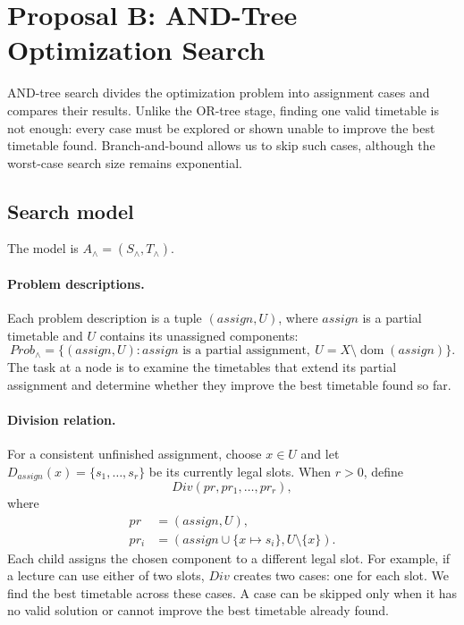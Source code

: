 \section{Proposal B: AND-Tree Optimization Search}
\label{andopt:section}

AND-tree search divides the optimization problem into
assignment cases and compares their results. Unlike the
OR-tree stage, finding one valid timetable is not enough:
every case must be explored or shown unable to improve
the best timetable found. Branch-and-bound allows us
to skip such cases, although the worst-case search
size remains exponential.

\subsection{Search model}
\label{sec:and-model}

The model is $A_{\land}=(S_{\land},T_{\land})$.

\paragraph{Problem descriptions.}
Each problem description is a tuple
$(\mathit{assign},U)$, where $\mathit{assign}$ is a
partial timetable and $U$ contains its unassigned
components:
\[
\mathit{Prob}_{\land}
=\{(\mathit{assign},U):
  \mathit{assign}\text{ is a partial assignment},\
  U=X\setminus\operatorname{dom}(\mathit{assign})\}.
\]
The task at a node is to examine the timetables that extend
its partial assignment and determine whether they improve
the best timetable found so far.

\paragraph{Division relation.}
For a consistent unfinished assignment, choose
$x\in U$ and let
$D_{\mathit{assign}}(x)=\{s_1,\ldots,s_r\}$
be its currently legal slots.
When $r>0$, define
\[
\mathit{Div}(pr,pr_1,\ldots,pr_r),
\]
where
\[
\begin{aligned}
pr&=(\mathit{assign},U),\\
pr_i&=(\mathit{assign}\cup\{x\mapsto s_i\},
       U\setminus\{x\}).
\end{aligned}
\]
Each child assigns the chosen component to a different legal
slot. For example, if a lecture can use either of two slots,
$\mathit{Div}$ creates two cases: one for each slot.
We find the best timetable across these cases. A case can
be skipped only when it has no valid solution or cannot
improve the best timetable already found.

